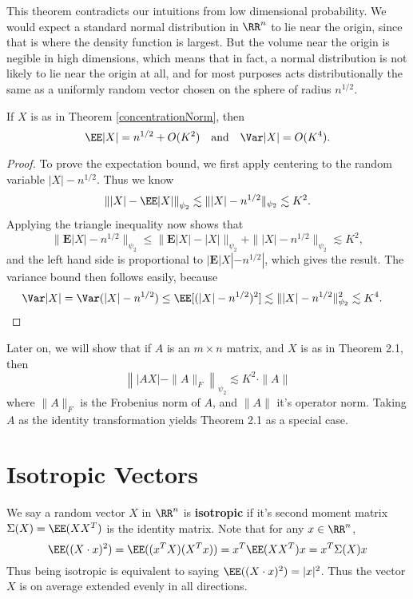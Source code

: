 This theorem contradicts our intuitions from low dimensional probability. We would expect a standard normal distribution in $\RR^n$ to lie near the origin, since that is where the density function is largest. But the volume near the origin is negible in high dimensions, which means that in fact, a normal distribution is not likely to lie near the origin at all, and for most purposes acts distributionally the same as a uniformly random vector chosen on the sphere of radius $n^{1/2}$.

\begin{corollary}
    If $X$ is as in Theorem \ref{concentrationNorm}, then
    \[ \EE |X| = n^{1/2} + O(K^2)\quad\text{and}\quad\Var |X| = O(K^4). \]
\end{corollary}
\begin{proof}
    To prove the expectation bound, we first apply centering to the random variable $|X| - n^{1/2}$. Thus we know
    \[ \left\| |X| - \EE |X| \right\|_{\psi_2} \lesssim \| |X| - n^{1/2} \|_{\psi_2} \lesssim K^2. \]
    Applying the triangle inequality now shows that
    \[ \| \mathbf{E} |X| - n^{1/2} \|_{\psi_2} \leq \| \mathbf{E} |X| - |X| \|_{\psi_2} + \| |X| - n^{1/2} \|_{\psi_2} \lesssim K^2, \]
    and the left hand side is proportional to $| \mathbf{E} |X| - n^{1/2} |$, which gives the result. The variance bound then follows easily, because
    \begin{align*}
        \Var |X| &= \Var(|X| - n^{1/2}) \leq \EE[(|X| - n^{1/2})^2] \lesssim \| |X| - n^{1/2} \|_{\psi_2}^2 \lesssim K^4. \qedhere
    \end{align*}
\end{proof}

Later on, we will show that if $A$ is an $m \times n$ matrix, and $X$ is as in Theorem 2.1, then
%
\[ \left\| |AX| - \| A \|_F \right\|_{\psi_2} \lesssim K^2 \cdot \| A \| \]
%
where $\| A \|_F$ is the Frobenius norm of $A$, and $\| A \|$ it's operator norm. Taking $A$ as the identity transformation yields Theorem 2.1 as a special case.

\section{Isotropic Vectors}

We say a random vector $X$ in $\RR^n$ is \textbf{isotropic} if it's second moment matrix $\Sigma(X) = \EE(XX^T)$ is the identity matrix. Note that for any $x \in \RR^n$,
%
\[ \EE((X \cdot x)^2) = \EE((x^T X)(X^T x)) = x^T \EE(XX^T) x = x^T \Sigma(X) x \]
%
Thus being isotropic is equivalent to saying $\EE((X \cdot x)^2) = |x|^2$. Thus the vector $X$ is on average extended evenly in all directions.

